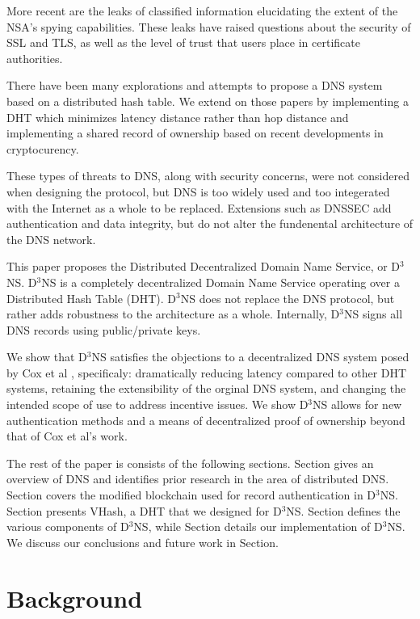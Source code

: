 \documentclass[11pt]{IEEEtran} %
\begin{document}
More recent are the leaks of classified information elucidating the extent of the NSA's spying capabilities. These leaks have raised questions about the security of SSL and TLS, as well as the level of trust that users place in certificate authorities.

There have been many explorations and attempts\cite{cox}\cite{pappas}\cite{ramasubramanian2004design} to propose a DNS system based on a distributed hash table\cite{chord}. We extend on those papers by implementing a DHT which minimizes latency distance rather than hop distance and implementing a shared record of ownership based on recent developments in cryptocurency.\cite{bitcoin}\cite{namecoin}

These types of threats to DNS, along with security concerns, were not considered when designing the protocol, but DNS is too widely used and too integerated with the Internet as a whole to be replaced. Extensions such as DNSSEC \cite{blacka2013clarifications} add authentication and data integrity, but do not alter the fundenental architecture of the DNS network.


This paper proposes the Distributed Decentralized Domain Name Service, or D$^{3}$NS.  D$^{3}$NS is a completely decentralized Domain Name Service operating over a Distributed Hash Table (DHT).  D$^{3}$NS does not replace the DNS protocol, but rather adds robustness to the architecture as a whole.  Internally, D$^3$NS signs all DNS records using public/private keys.


We show that D$^{3}$NS satisfies the objections to a decentralized DNS system posed by Cox et al \cite{cox}, specificaly: dramatically reducing latency compared to other DHT systems, retaining the extensibility of the orginal DNS system, and changing the intended scope of use to address incentive issues. We show D$^{3}$NS allows for new authentication methods and a means of decentralized proof of ownership beyond that of Cox et al's work. 


The rest of the paper is consists of the following sections.  Section gives an overview of DNS and identifies prior research in the area of distributed DNS.  Section covers the modified blockchain used for record authentication in D$^3$NS.  Section presents VHash, a DHT that we designed for D$^3$NS.  Section defines the various components of D$^3$NS, while Section details our implementation of D$^3$NS.  We discuss our conclusions and future work in Section.


\section{Background}
\end{document}
